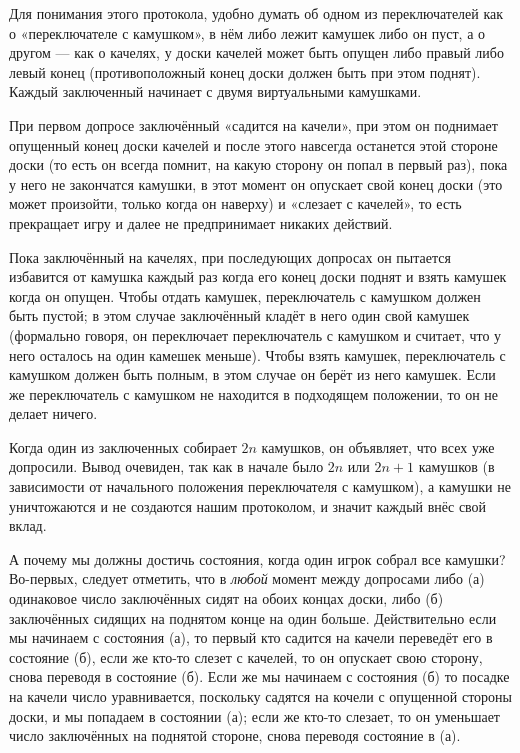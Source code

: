 \medskip

Для понимания этого протокола, удобно думать об одном из переключателей как о «переключателе с камушком», в нём либо лежит камушек либо он пуст, а о другом --- как о качелях, у доски качелей может быть опущен либо правый либо  левый конец (противоположный конец доски должен быть при этом поднят).
Каждый заключенный начинает с двумя виртуальными камушками.

При первом допросе заключённый «садится на качели», при этом он поднимает опущенный конец доски качелей и
после этого навсегда останется этой стороне доски (то есть он всегда помнит, на какую сторону он попал в первый раз), пока у него не закончатся камушки, в этот момент он опускает свой конец доски (это может произойти, только когда он наверху) и «слезает с качелей», то есть прекращает игру и далее не предпринимает никаких действий.

Пока заключённый на качелях,
при последующих допросах он пытается избавится от камушка каждый раз когда его конец доски поднят
и взять камушек когда он опущен.
Чтобы отдать камушек, переключатель с камушком должен быть пустой;
в этом случае заключённый 
кладёт в него один свой камушек (формально говоря, он переключает переключатель с камушком и считает, что у него осталось на один камешек меньше).
Чтобы взять камушек, переключатель с камушком должен быть полным, в этом случае он берёт из него камушек.
Если же переключатель с камушком не находится в подходящем положении, то он не делает ничего.

Когда один из заключенных собирает $2n$ камушков, он объявляет, что всех уже допросили.
Вывод очевиден, так как в начале было $2n$ или $2n+1$ камушков (в зависимости от начального положения переключателя с камушком), а камушки не уничтожаются и не создаются нашим протоколом, и значит каждый внёс свой вклад.

А почему мы должны достичь состояния, когда один игрок собрал все камушки?
Во-первых, следует отметить, что в \emph{любой} момент между допросами либо 
(а) одинаковое число заключённых сидят на обоих концах доски, либо 
(б) заключённых сидящих на поднятом конце на один больше.
Действительно если мы начинаем с состояния (а), то первый кто садится на качели переведёт его в состояние (б), если же кто-то слезет с качелей, то он опускает свою сторону, снова переводя в состояние (б).
Если же мы начинаем с состояния (б) то посадке на качели число уравнивается, поскольку садятся на кочели с опущенной стороны доски, и мы попадаем в состоянии (а);
если же кто-то слезает, то он уменьшает число заключённых на поднятой стороне, снова переводя состояние в (а).

